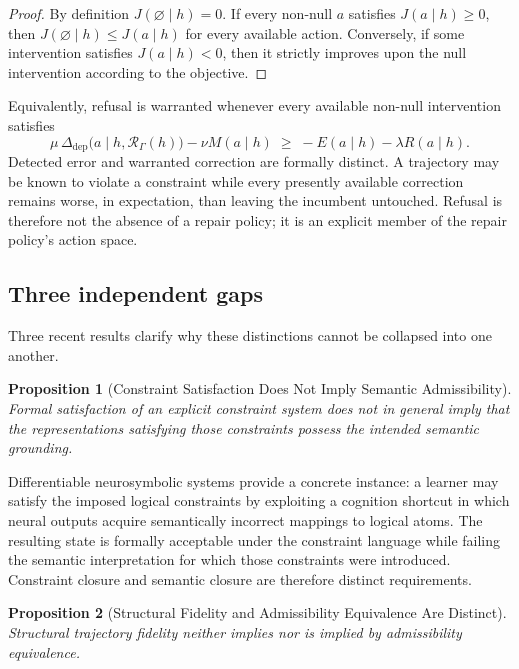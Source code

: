 \documentclass[11pt]{article}
\newtheorem{proposition}{Proposition}[section]
\begin{document}
\begin{proof}
	By definition $J(\varnothing \mid h) = 0$. If every non-null $a$
	satisfies $J(a \mid h) \geq 0$, then $J(\varnothing \mid h) \leq
	J(a \mid h)$ for every available action. Conversely, if some
	intervention satisfies $J(a \mid h) < 0$, then it strictly improves upon
	the null intervention according to the objective.
\end{proof}

Equivalently, refusal is warranted whenever every available non-null
intervention satisfies
\[
	\mu \, \Delta_{\mathrm{dep}}\bigl(a \mid h, \mathcal{R}_\Gamma(h)\bigr)
	- \nu M(a \mid h)
	\;\geq\;
	-E(a \mid h) - \lambda R(a \mid h).
\]
Detected error and warranted correction are formally distinct. A
trajectory may be known to violate a constraint while every presently
available correction remains worse, in expectation, than leaving the
incumbent untouched. Refusal is therefore not the absence of a repair
policy; it is an explicit member of the repair policy's action space.

\subsection{Three independent gaps}

Three recent results clarify why these distinctions cannot be collapsed
into one another.

\begin{proposition}[Constraint Satisfaction Does Not Imply Semantic Admissibility]
	Formal satisfaction of an explicit constraint system does not in general
	imply that the representations satisfying those constraints possess the
	intended semantic grounding.
\end{proposition}

Differentiable neurosymbolic systems provide a concrete instance: a
learner may satisfy the imposed logical constraints by exploiting a
cognition shortcut in which neural outputs acquire semantically
incorrect mappings to logical atoms. The resulting state is formally
acceptable under the constraint language while failing the semantic
interpretation for which those constraints were introduced. Constraint
closure and semantic closure are therefore distinct requirements.

\begin{proposition}[Structural Fidelity and Admissibility Equivalence Are Distinct]
	Structural trajectory fidelity neither implies nor is implied by
	admissibility equivalence.
\end{proposition}
\end{document}
